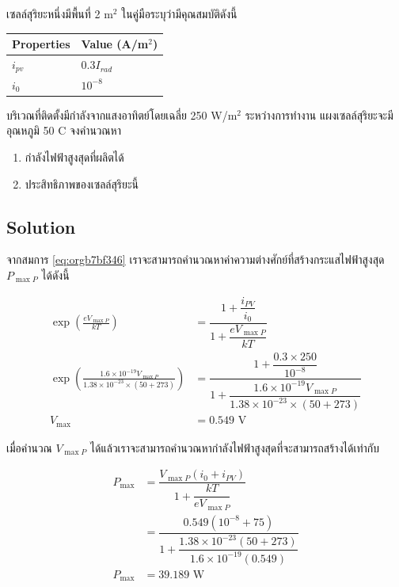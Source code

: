 \documentclass[a4paper,nobib,openany,10pt]{tufte-book}
\begin{document}
เซลล์สุริยะหนึ่งมีพื้นที่ 2 m\(^{\text{2}}\)
ในคู่มือระบุว่ามีคุณสมบัติดังนี้

\begin{center}
\begin{tabular}{ll}
\toprule
Properties & Value (A/m\(^{\text{2}}\))\\
\midrule
\(i_{pv}\) & \(0.3 I_{rad}\)\\
\(i_0\) & \(10^{-8}\)\\
\bottomrule
\end{tabular}
\end{center}

บริเวณที่ติดตั้งมีกำลังจากแสงอาทิตย์โดยเฉลี่ย 250 W/m\(^2\)
ระหว่างการทำงาน แผงเซลล์สุริยะจะมีอุณหภูมิ 50 C จงคำนวณหา

\begin{enumerate}
\item กำลังไฟฟ้าสูงสุดที่ผลิตได้

\item ประสิทธิภาพของเซลล์สุริยะนี้
\end{enumerate}

\subsection{Solution}
\label{sec:org460f2e0}
จากสมการ \ref{eq:orgb7bf346} เราจะสามารถคำนวณหาค่าความต่างศักย์ที่สร้างกระแสไฟฟ้าสูงสุด
\(P_{\max P}\) ได้ดังนี้

\begin{align*}
  \exp \left(\frac{e V_{\max P}}{kT} \right) &= \dfrac{1+\dfrac{i_{PV}}{i_0}}{1+ \dfrac{e V_{\max P}}{kT}} \\
  \exp \left(\frac{ 1.6 \times 10^{-19} V_{\max P} }{ 1.38 \times 10^{-23} \times (50 + 273)} \right) &= \dfrac{1+ \dfrac{0.3 \times 250}{10^{-8}}}{1+\dfrac{1.6 \times 10^{-19} V_{\max P}}{1.38 \times 10^{-23} \times (50 + 273)}} \\
  V_{\max} &= 0.549 \text{ V}
\end{align*}

เมื่อคำนวณ \(V_{\max P}\)
ได้แล้วเราจะสามารถคำนวณหากำลังไฟฟ้าสูงสุดที่จะสามารถสร้างได้เท่ากับ

\[\begin{aligned}
    P_{\max} &=  \dfrac{V_{\max P} ( i_0 + i_{PV} )}{1 + \dfrac{kT}{e V_{\max P}}} \\
             &= \dfrac{0.549 \left(10^{-8} + 75\right)}{1 + \dfrac{ 1.38 \times 10^{-23} (50 + 273)}{1.6 \times 10^{-19} (0.549)}} \\
             P_{\max} &= 39.189 \text{ W}
  \end{aligned}\]
\end{document}

